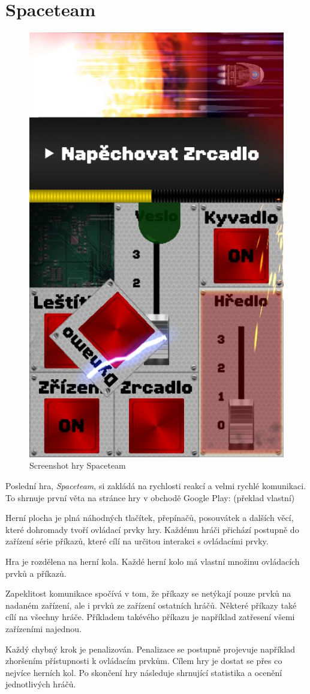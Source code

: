 \section{Spaceteam}

\begin{figure}
    \centering
    \includegraphics[width=0.5\linewidth]{assets/competitive-apps/spaceteam.jpg}
    \caption{Screenshot hry Spaceteam \cite{henrysmithinc_spaceteam}}
    \label{fig:spaceteam}
\end{figure}

Poslední hra, \emph{Spaceteam}, si zakládá na rychlosti reakcí a velmi rychlé
komunikaci.
To shrnuje první věta na stránce hry v obchodě Google Play:
\emph{}
\cite{henrysmithinc_spaceteam} (překlad vlastní)

Herní plocha je plná náhodných tlačítek, přepínačů, posouvátek a dalších věcí,
které dohromady tvoří ovládací prvky hry.
Každému hráči přichází postupně do zařízení série příkazů,
které cílí na určitou interakci s ovládacími prvky.

Hra je rozdělena na herní kola.
Každé herní kolo má vlastní množinu ovládacích prvků a příkazů.

Zapeklitost komunikace spočívá v tom,
že příkazy se netýkají pouze prvků na nadaném zařízení,
ale i prvků ze zařízení ostatních hráčů.
Některé příkazy také cílí na všechny hráče.
Příkladem takévého příkazu je například zatřesení všemi zařízeními najednou.

Každý chybný krok je penalizován.
Penalizace se postupně projevuje například zhoršením přístupnosti k ovládacím
prvkům.
Cílem hry je dostat se přes co nejvíce herních kol.
Po skončení hry následuje shrnující statistika a ocenění jednotlivých hráčů.

